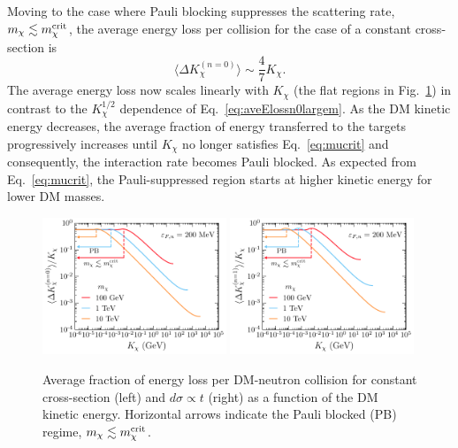 Moving to the case where Pauli blocking suppresses the scattering rate, $m_\chi\lesssim m_\chi^{\rm crit}$, the average energy loss per collision for the case of a constant cross-section is
\begin{equation}
\langle \Delta K_\chi^{(n=0)} \rangle \sim 
\frac{4}{7}K_\chi. 
\label{eq:aveElossn0}
\end{equation}
The average energy loss now scales linearly with $K_\chi$ (the flat regions in Fig.~\ref{fig:Taven0}) in contrast to the $K_\chi^{1/2}$ dependence of Eq.~\ref{eq:aveElossn0largem}.
As the DM kinetic energy decreases, the average fraction of energy transferred to the targets progressively increases until $K_\chi$ no longer satisfies Eq.~\ref{eq:mucrit} and consequently, the interaction rate becomes Pauli blocked.
As expected from Eq.~\ref{eq:mucrit}, the Pauli-suppressed region starts at higher kinetic energy for lower DM masses. 


\begin{figure}
  \centering
  \includegraphics[width=0.49\textwidth]{q0ave_Tdm_n0.pdf}
  \includegraphics[width=0.49\textwidth]{q0ave_Tdm_n1.pdf}
  \caption{Average fraction of energy loss per DM-neutron collision for constant cross-section (left) and $d\sigma\propto t$ (right) as a function of the DM kinetic energy. Horizontal arrows indicate the Pauli blocked (PB) regime, $m_\chi\lesssim m_\chi^{\rm crit}$. 
  } 
  \label{fig:Taven0}
\end{figure}




